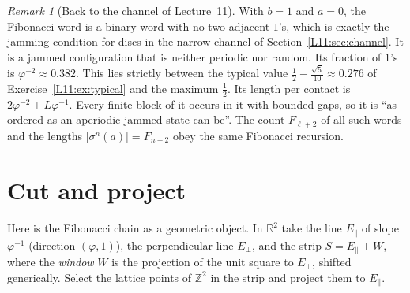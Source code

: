 \documentclass[11pt,openany]{book}
\theoremstyle{plain}
\theoremstyle{definition}
\theoremstyle{remark}
\newtheorem{remark}[theorem]{Remark}
\newcommand{\R}{\mathbb{R}}
\newcommand{\Z}{\mathbb{Z}}
\newcommand{\abs}[1]{\left\lvert #1 \right\rvert}
\begin{document}
\begin{remark}[Back to the channel of Lecture~11]
With $b=1$ and $a=0$, the Fibonacci word is a binary word with no two adjacent $1$'s, which is exactly
the jamming condition for discs in the narrow channel of Section~\ref{L11:sec:channel}. It is a
jammed configuration that is neither periodic nor random. Its fraction of $1$'s is
$\varphi^{-2}\approx0.382$. This lies strictly between the typical value
$\frac12-\frac{\sqrt5}{10}\approx0.276$ of Exercise~\ref{L11:ex:typical} and the maximum $\frac12$. Its
length per contact is $2\varphi^{-2}+L\varphi^{-1}$. Every finite block of it occurs in it with bounded
gaps, so it is ``as ordered as an aperiodic jammed state can be''. The count $F_{\ell+2}$ of all such
words and the lengths $\abs{\sigma^n(a)}=F_{n+2}$ obey the same Fibonacci recursion.
\end{remark}

\section{Cut and project}
\label{ERG:sec:cutproject}

Here is the Fibonacci chain as a geometric object. In $\R^2$ take the line $E_\parallel$ of slope
$\varphi^{-1}$ (direction $(\varphi,1)$), the perpendicular line $E_\perp$, and the strip
$S=E_\parallel+W$, where the \emph{window} $W$ is the projection of the unit square to $E_\perp$, shifted
generically. Select the lattice points of $\Z^2$ in the strip and project them to $E_\parallel$.
\end{document}
